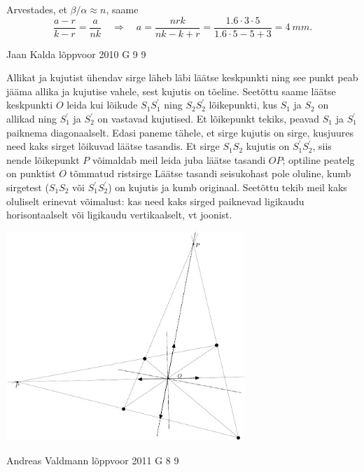 \documentclass[11pt]{article}
\begin{document}
{{Arvestades, et $\beta /\alpha \approx n$, saame
\[
\frac{a-r}{k-r}=\frac{a}{n k} \quad \Rightarrow \quad a=\frac{n r k}{n k-k+r}=\frac{\num{1,6} \cdot \num{3} \cdot \num{5}}{\num{1,6} \cdot \num{5}-\num{5}+\num{3}}=\SI{4}{mm}.
\]
\fi
}

{Jaan Kalda} %
{lõppvoor} %
{2010} %
{G 9} %
{9} %
{

\ifSolution
Allikat ja kujutist ühendav sirge läheb läbi läätse keskpunkti ning see punkt peab jääma allika ja kujutise vahele, sest kujutis on tõeline.
Seetõttu saame läätse keskpunkti $O$ leida kui lõikude $S_1S_1^\prime$ ning $S_2S_2^\prime$ lõikepunkti, kus $S_1$ ja $S_2$ on allikad ning $S_1^\prime$ ja $S_2^\prime$
on vastavad kujutised. Et lõikepunkt tekiks, peavad $S_1$ ja $S_1^\prime$ paiknema diagonaalselt. Edasi paneme tähele, et sirge kujutis on sirge, kusjuures
need kaks sirget lõikuvad läätse tasandis. Et sirge $S_1S_2$ kujutis on $S_1^\prime S_2^\prime$, siis nende lõikepunkt $P$ võimaldab meil leida juba
läätse tasandi $OP$; optiline peatelg on punktist $O$ tõmmatud ristsirge Läätse tasandi seisukohast pole oluline, kumb sirgetest ($S_1S_2$ või $S_1^\prime S_2^\prime$) on kujutis ja kumb originaal.
Seetõttu tekib meil kaks oluliselt erinevat võimalust: kas need kaks sirged paiknevad ligikaudu horisontaalselt või ligikaudu vertikaalselt, vt joonist.\\

\begin{center}
	\includegraphics[width=90mm]{2010-v3g-09-punktid_lah}
\end{center}
\fi
}

{Andreas Valdmann} %
{lõppvoor} %
{2011} %
{G 8} %
{9} %
{

}}
\end{document}
